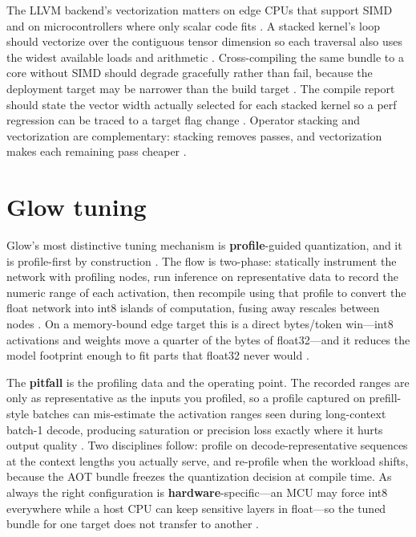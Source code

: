 The LLVM backend's vectorization matters on edge CPUs that support SIMD and on microcontrollers where only scalar code fits \citep{pytorchglow2024,dlbook}. A stacked kernel's loop should vectorize over the contiguous tensor dimension so each traversal also uses the widest available loads and arithmetic \citep{rotem2018glow,patel2025llminference}. Cross-compiling the same bundle to a core without SIMD should degrade gracefully rather than fail, because the deployment target may be narrower than the build target \citep{pytorchglow2024,chen2020compilerbasedhardw}. The compile report should state the vector width actually selected for each stacked kernel so a perf regression can be traced to a target flag change \citep{memoryfloor2026,taxbreak2026}. Operator stacking and vectorization are complementary: stacking removes passes, and vectorization makes each remaining pass cheaper \citep{rotem2018glow,memoryfloor2026}.

\section{Glow tuning}
\label{sec:ch19_glow_tuning}

Glow's most distinctive tuning mechanism is \textbf{profile}-guided quantization, and it is profile-first by construction \citep{rotem2018glow}. The flow is two-phase: statically instrument the network with profiling nodes, run inference on representative data to record the numeric range of each activation, then recompile using that profile to convert the float network into int8 islands of computation, fusing away rescales between nodes \citep{pytorchglow2024}. On a memory-bound edge target this is a direct bytes/token win---int8 activations and weights move a quarter of the bytes of float32---and it reduces the model footprint enough to fit parts that float32 never would \citep{taxbreak2026,memoryfloor2026}.

The \textbf{pitfall} is the profiling data and the operating point. The recorded ranges are only as representative as the inputs you profiled, so a profile captured on prefill-style batches can mis-estimate the activation ranges seen during long-context batch-1 decode, producing saturation or precision loss exactly where it hurts output quality \citep{kwon2023vllm,dlbook}. Two disciplines follow: profile on decode-representative sequences at the context lengths you actually serve, and re-profile when the workload shifts, because the AOT bundle freezes the quantization decision at compile time. As always the right configuration is \textbf{hardware}-specific---an MCU may force int8 everywhere while a host CPU can keep sensitive layers in float---so the tuned bundle for one target does not transfer to another \citep{amd2024xdna,patel2025llminference}.

